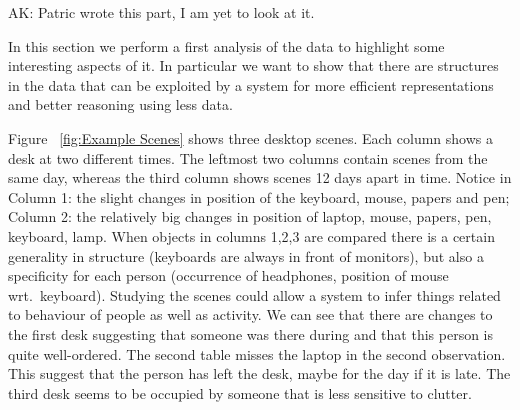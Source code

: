 \documentclass[letterpaper, 10 pt, conference]{ieeeconf}  %
\begin{document}
{\color{blue} AK: Patric wrote this part, I am yet to look at it.}

In this section we perform a first analysis of the data to highlight some interesting aspects of it. In particular we want to show that 
there are structures in the data that can be exploited by a system for more efficient representations and better reasoning using less data.

Figure ~\ref{fig:Example Scenes} shows three desktop scenes. Each column shows a desk at two different times. The leftmost two columns 
contain scenes from the same day, whereas the third column shows scenes 12 days apart in time. Notice in Column 1: the slight changes in 
position of the keyboard, mouse, papers and pen; Column 2: the relatively big changes in position of laptop, mouse, papers, pen, keyboard, 
lamp. When objects in columns 1,2,3 are compared there is a certain generality in structure (keyboards are always in front of monitors), but 
also a specificity for each person (occurrence of headphones, position of mouse wrt.\ keyboard). Studying the scenes could allow a system to 
infer things related to behaviour of people as well as activity. We can see that there are changes to the first desk suggesting that someone 
was there during and that this person is quite well-ordered. The second table misses the laptop in the second observation. This suggest that 
the person has left the desk, maybe for the day if it is late. The third desk seems to be occupied by someone that is less sensitive to 
clutter.
\end{document}
